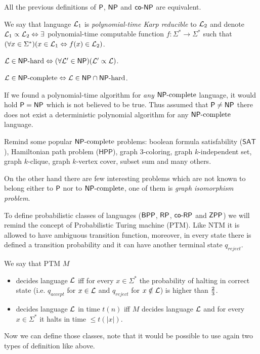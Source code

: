 		\begin{thm}
			All the previous definitions of $\P$, $\NP$ and $\coNP$ are equivalent.
		\end{thm}
		
		\begin{defn}
			We say that language ${\cal L}_1$ is {\em polynomial-time Karp reducible} to ${\cal L}_2$ and denote ${\cal L}_1\propto{\cal L}_2 \iff \exists$ polynomial-time computable function $f:\Sigma^*\rightarrow\Sigma^*$ such that $(\forall x\in\Sigma^*)(x\in{\cal L}_1\iff f(x)\in{\cal L}_2)$.
		\end{defn}
		
		\begin{defn}
			${\cal L}\in\NPH \iff (\forall{\cal L'}\in\NP)({\cal L'}\propto{\cal L})$.
		\end{defn}
		
		\begin{defn}
			${\cal L}\in\NPC\iff{\cal L}\in\NP\cap\NPH$.
		\end{defn}
		
		\begin{note}
			If we found a polynomial-time algorithm for {\em any} $\NPC$ language, it would hold $\P=\NP$ which is not believed to be true. Thus assumed that $\P\neq\NP$ there does not exist a deterministic polynomial algorithm for any $\NPC$ language.
		\end{note}
		
		\begin{example}\label{exm:npc}
			Remind some popular $\NPC$ problems: boolean formula satisfability ($\mathsf{SAT}$), Hamiltonian path problem ($\mathsf{HPP}$), graph $3$-coloring, graph $k$-independent set, graph $k$-clique, graph $k$-vertex cover, subset sum and many others.
			
			On the other hand there are few interesting problems which are not known to belong either to $\P$ nor to $\NPC$, one of them is {\em graph isomorphism problem}.
		\end{example}
		
		
		To define probabilistic classes of languages ($\BPP$, $\RP$, $\coRP$ and $\ZPP$) we will remind the concept of Probabilistic Turing machine (PTM). Like NTM it is allowed to have ambiguous transition function, moreover, in every state there is defined a transition probability and it can have another terminal state $q_{reject}$.
		
		We say that PTM $M$
		\begin{itemize}
			\item decides language $\cal L$ iff for every $x\in\Sigma^*$ the probability of halting in correct state (i.e. $q_{accept}$ for $x\in{\cal L}$ and $q_{reject}$ for $x\notin{\cal L}$) is higher than $\nicefrac{2}{3}$.
			\item decides language $\cal L$ in time $t(n)$ iff $M$ decides language $\cal L$ and for every $x\in\Sigma^*$ it halts in time $\leq t(|x|)$.
		\end{itemize}
		Now we can define those classes, note that it would be possible to use again two types of definition like above.
		
